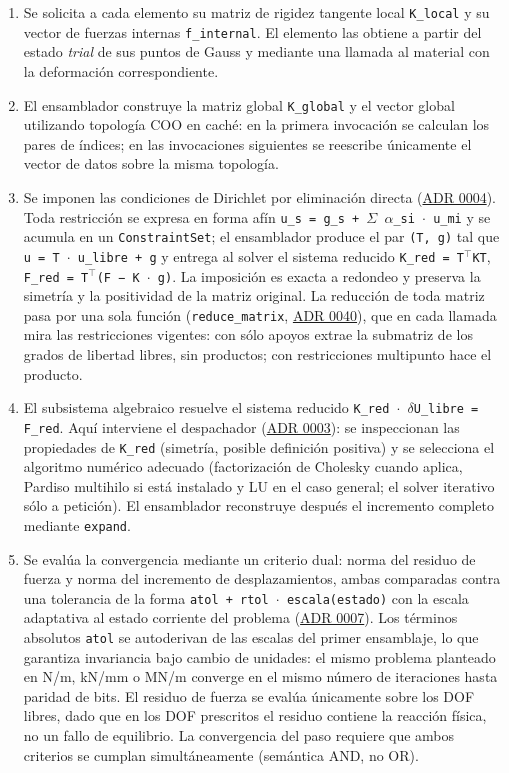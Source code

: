 \documentclass[11pt,oneside]{report}
\begin{document}
\begin{enumerate}
  \item Se solicita a cada elemento su matriz de rigidez tangente local \texttt{K\_local} y su vector de fuerzas internas \texttt{f\_internal}. El elemento las obtiene a partir del estado \textit{trial} de sus puntos de Gauss y mediante una llamada al material con la deformación correspondiente.
  \item El ensamblador construye la matriz global \texttt{K\_global} y el vector global utilizando topología COO en caché: en la primera invocación se calculan los pares de índices; en las invocaciones siguientes se reescribe únicamente el vector de datos sobre la misma topología.
  \item Se imponen las condiciones de Dirichlet por eliminación directa (\hyperref[adr:0004]{ADR 0004}). Toda restricción se expresa en forma afín \texttt{u\_\allowbreak{}s = g\_\allowbreak{}s + \ensuremath{\Sigma} \ensuremath{\alpha}\_\allowbreak{}si \ensuremath{\cdot} u\_\allowbreak{}mi} y se acumula en un \texttt{ConstraintSet}; el ensamblador produce el par \texttt{(T, g)} tal que \texttt{u = T \ensuremath{\cdot} u\_\allowbreak{}libre + g} y entrega al solver el sistema reducido \texttt{K\_red = T\ensuremath{^{\top}}KT}, \texttt{F\_\allowbreak{}red = T\ensuremath{^{\top}}(F − K \ensuremath{\cdot} g)}. La imposición es exacta a redondeo y preserva la simetría y la positividad de la matriz original. La reducción de toda matriz pasa por una sola función (\texttt{reduce\_matrix}, \hyperref[adr:0040]{ADR 0040}), que en cada llamada mira las restricciones vigentes: con sólo apoyos extrae la submatriz de los grados de libertad libres, sin productos; con restricciones multipunto hace el producto.
  \item El subsistema algebraico resuelve el sistema reducido \texttt{K\_\allowbreak{}red \ensuremath{\cdot} \ensuremath{\delta}U\_\allowbreak{}libre = F\_\allowbreak{}red}. Aquí interviene el despachador (\hyperref[adr:0003]{ADR 0003}): se inspeccionan las propiedades de \texttt{K\_red} (simetría, posible definición positiva) y se selecciona el algoritmo numérico adecuado (factorización de Cholesky cuando aplica, Pardiso multihilo si está instalado y LU en el caso general; el solver iterativo sólo a petición). El ensamblador reconstruye después el incremento completo mediante \texttt{expand}.
  \item Se evalúa la convergencia mediante un criterio dual: norma del residuo de fuerza y norma del incremento de desplazamientos, ambas comparadas contra una tolerancia de la forma \texttt{atol + rtol \ensuremath{\cdot} escala(estado)} con la escala adaptativa al estado corriente del problema (\hyperref[adr:0007]{ADR 0007}). Los términos absolutos \texttt{atol} se autoderivan de las escalas del primer ensamblaje, lo que garantiza invariancia bajo cambio de unidades: el mismo problema planteado en N/m, kN/mm o MN/m converge en el mismo número de iteraciones hasta paridad de bits. El residuo de fuerza se evalúa únicamente sobre los DOF libres, dado que en los DOF prescritos el residuo contiene la reacción física, no un fallo de equilibrio. La convergencia del paso requiere que ambos criterios se cumplan simultáneamente (semántica AND, no OR).
\end{enumerate}
\end{document}
